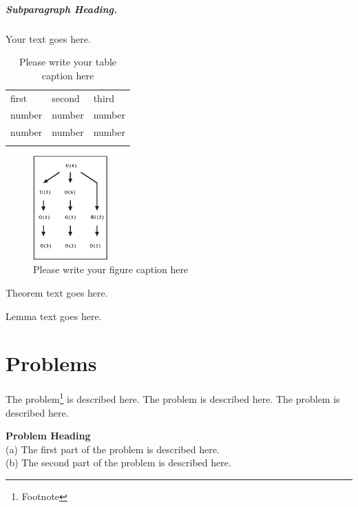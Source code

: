 \subparagraph{Subparagraph Heading.} Your text goes here.%
%
%
%
\begin{table}
\centering
\caption{Please write your table caption here}
\label{tab:1}       %
%
%
\begin{tabular}{lll}
\hline\noalign{\smallskip}
first & second & third  \\
\noalign{\smallskip}\hline\noalign{\smallskip}
number & number & number \\
number & number & number \\
\noalign{\smallskip}\hline
\end{tabular}
\end{table}
%
%
%
\begin{figure}
\centering
\includegraphics[height=4cm]{figure.eps}
%
%
\caption{Please write your figure caption here}
\label{fig:1}       %
\end{figure}
%
%
\begin{theorem}
Theorem text goes here.
\end{theorem}
%
%
\begin{lemma}
Lemma text goes here.
\end{lemma}
%
%
\section*{Problems}
%
\begin{prob}
\label{prob1}
The problem\footnote{Footnote} is described here. The
problem is described here. The problem is described here.
\end{prob}

\begin{prob}
\label{prob2}
\textbf{Problem Heading}\\
(a) The first part of the problem is described here.\\
(b) The second part of the problem is described here.
\end{prob}



%
